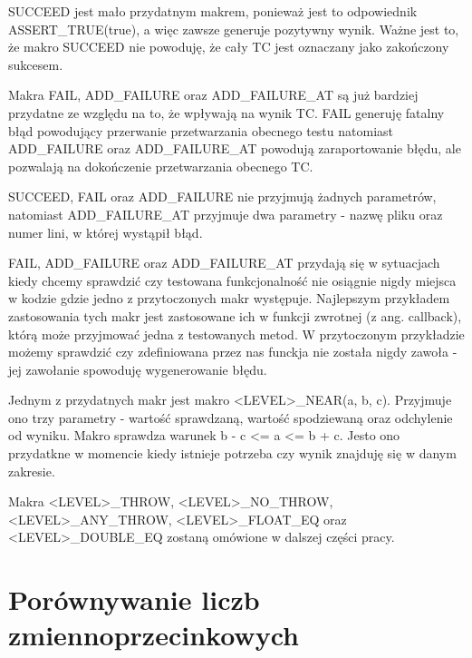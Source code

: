 \documentclass[12pt,a4paper,notitlepage]{report}
\begin{document}
SUCCEED jest mało przydatnym makrem, ponieważ jest to odpowiednik ASSERT{\_}TRUE(true), a więc zawsze generuje pozytywny wynik. Ważne jest to, że makro SUCCEED nie powoduję, że cały TC jest oznaczany jako zakończony sukcesem.

Makra FAIL, ADD{\_}FAILURE oraz ADD{\_}FAILURE{\_}AT są już bardziej przydatne ze względu na to, że wpływają na wynik TC. FAIL generuję fatalny błąd powodujący przerwanie przetwarzania obecnego testu natomiast ADD{\_}FAILURE oraz ADD{\_}FAILURE{\_}AT powodują zaraportowanie błędu, ale pozwalają na dokończenie przetwarzania obecnego TC.

SUCCEED, FAIL oraz ADD{\_}FAILURE nie przyjmują żadnych parametrów, natomiast ADD{\_}FAILURE{\_}AT przyjmuje dwa parametry - nazwę pliku oraz numer lini, w której wystąpił błąd.

FAIL, ADD{\_}FAILURE oraz ADD{\_}FAILURE{\_}AT przydają się w sytuacjach kiedy chcemy sprawdzić czy testowana funkcjonalność nie osiągnie nigdy miejsca w kodzie gdzie jedno z przytoczonych makr występuje. Najlepszym przykładem zastosowania tych makr jest zastosowane ich w funkcji zwrotnej (z ang. callback), którą może przyjmować jedna z testowanych metod. W przytoczonym przykładzie możemy sprawdzić czy zdefiniowana przez nas funckja nie została nigdy zawoła - jej zawołanie spowoduję wygenerowanie błędu.

Jednym z przydatnych makr jest makro <LEVEL>{\_}NEAR(a, b, c). Przyjmuje ono trzy parametry - wartość sprawdzaną, wartość spodziewaną oraz odchylenie od wyniku. Makro sprawdza warunek b - c <= a <= b + c. Jesto ono przydatkne w momencie kiedy istnieje potrzeba czy wynik znajduję się w danym zakresie.

Makra <LEVEL>{\_}THROW, <LEVEL>{\_}NO{\_}THROW, <LEVEL>{\_}ANY{\_}THROW, <LEVEL>{\_}FLOAT{\_}EQ oraz <LEVEL>{\_}DOUBLE{\_}EQ zostaną omówione w dalszej części pracy.

			

\chapter{Porównywanie liczb zmiennoprzecinkowych}
\end{document}

